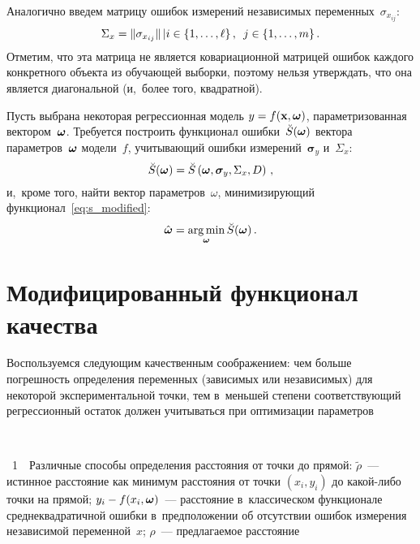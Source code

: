 \begin{multicols}{2}
Аналогично введем матрицу ошибок измерений независимых переменных~$\sigma_{x_{ij}}$:
$$
  \Sigma_x = \| \sigma_{x_{ij}} \|\, | i \in \{ 1, \dots, \ell \}\,,\enskip j \in \{ 1, 
\dots, m \}\,.
$$
Отметим, что эта мат\-ри\-ца не является ковариационной мат\-ри\-цей ошибок
каждого конкретного объекта из обучающей выборки,
поэтому нельзя утверждать, что она является
диагональной (и,~более того, квадратной).

Пусть выбрана некоторая регрессионная модель
$y \hm= f (\mathbf{x}, \bomega)$, параметризованная вектором~$\boldsymbol{\omega}$.
Требуется построить функционал ошибки~$\breve{S}(\boldsymbol{\omega})$ вектора 
па\-ра\-мет\-ров~$\boldsymbol{\omega}$ 
модели~$f$, учитывающий ошибки измерений~$\boldsymbol{\sigma}_y$ и~$\Sigma_x$:
\begin{equation}
  \breve{S}(\boldsymbol{\omega}) = \breve{S}\left(\boldsymbol{\omega}, \boldsymbol{\sigma}_y, \Sigma_x, D\right)\,,
  \label{eq:s_modified}
\end{equation}
и,~кроме того, найти вектор па\-ра\-мет\-ров~$\omega$, минимизирующий 
функционал~\eqref{eq:s_modified}:
\begin{equation*}
  \hat{\boldsymbol{\omega}} = \mathop{\arg \min}\limits_{\boldsymbol{\omega}} \breve{S}(\boldsymbol{\omega})\,.
\end{equation*}

\section{Модифицированный функционал качества}

Воспользуемся следующим качественным соображением:
чем больше погрешность определения переменных (зависимых или независимых)
для некоторой экспериментальной точки, тем в~меньшей степени соответствующий
регрессионный оста\-ток должен учитываться при оптимизации па\-ра\-мет\-ров\linebreak\vspace*{-12pt}

\columnbreak

 { \begin{center}  %
 \vspace*{1pt}
 \mbox{%
\epsfxsize=77.346mm
}
\end{center}

\vspace*{-1pt}


\noindent
{{\figurename~1}\ \ \small{Различные способы определения расстояния от точки до прямой: 
$\tilde{\rho}$~---
    истинное расстояние как минимум расстояния от точки $(x_i, y_i)$ до ка\-кой-ли\-бо
    точки на прямой; $y_i \hm- f(x_i, \bomega)$~--- расстояние в~классическом
    функционале среднеквадратичной ошибки в~предположении об отсутствии ошибок 
измерения     независимой переменной~$x$; $\rho$~--- предлагаемое расстояние}}
}


\end{multicols}
